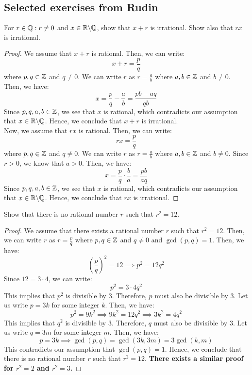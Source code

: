 \documentclass[openany]{book}
\begin{document}
\subsection{Selected exercises from Rudin}
\begin{exercise}
    For $r \in \mathbb{Q}: r\neq0$ and $x \in \mathbb{R}\backslash \mathbb{Q}$, show that $x + r$ is irrational. Show also that $rx$ is irrational.
\end{exercise}
\begin{proof}
We assume that $x + r$ is rational. Then, we can write:
$$x + r = \frac{p}{q}$$
where $p, q \in \mathbb{Z}$ and $q \neq 0$. We can write $r$ as $r = \frac{a}{b}$ where $a, b \in \mathbb{Z}$ and $b \neq 0$. Then, we have:
$$x = \frac{p}{q} - \frac{a}{b} = \frac{pb - aq}{qb}$$
Since $p, q, a, b \in \mathbb{Z}$, we see that $x$ is rational, which contradicts our assumption that $x \in \mathbb{R} \backslash \mathbb{Q}$. Hence, we conclude that $x + r$ is irrational. \\
Now, we assume that $rx$ is rational. Then, we can write:
$$rx = \frac{p}{q}$$
where $p, q \in \mathbb{Z}$ and $q \neq 0$. We can write $r$ as $r = \frac{a}{b}$ where $a, b \in \mathbb{Z}$ and $b \neq 0$. Since $r>0$, we know that $a>0$. Then, we have:
$$x = \frac{p}{q} \cdot \frac{b}{a} = \frac{pb}{aq}$$
Since $p, q, a, b \in \mathbb{Z}$, we see that $x$ is rational, which contradicts our assumption that $x \in \mathbb{R} \backslash \mathbb{Q}$. Hence, we conclude that $rx$ is irrational.
\end{proof}
\begin{exercise}
    Show that there is no rational number $r$ such that $r^2 = 12$.
\end{exercise}
\begin{proof}
We assume that there exists a rational number $r$ such that $r^2 = 12$. Then, we can write $r$ as $r = \frac{p}{q}$ where $p, q \in \mathbb{Z}$ and $q \neq 0$ and $\gcd(p, q) = 1$. Then, we have:
$$\left(\frac{p}{q}\right)^2 = 12 \implies p^2 = 12q^2$$
Since $12 = 3 \cdot 4$, we can write:
$$p^2 = 3 \cdot 4q^2$$
This implies that $p^2$ is divisible by $3$. Therefore, $p$ must also be divisible by $3$. Let us write $p = 3k$ for some integer $k$. Then, we have:
$$p^2 = 9k^2 \implies 9k^2 = 12q^2 \implies 3k^2 = 4q^2$$
This implies that $q^2$ is divisible by $3$. Therefore, $q$ must also be divisible by $3$. Let us write $q = 3m$ for some integer $m$. Then, we have:
$$p = 3k \implies \gcd(p, q) = \gcd(3k, 3m) = 3\gcd(k, m)$$
This contradicts our assumption that $\gcd(p, q) = 1$. Hence, we conclude that there is no rational number $r$ such that $r^2 = 12$.
\textbf{There exists a similar proof for $r^2 = 2$ and $r^2 = 3$.}
\end{proof}
\end{document}
